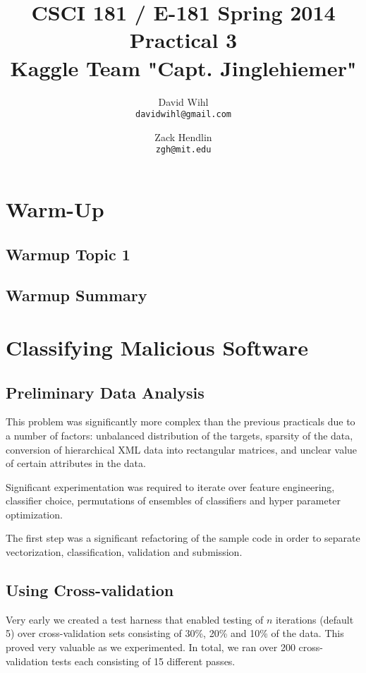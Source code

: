 \documentclass[11pt, oneside]{article}   	%
\title{CSCI 181 / E-181 Spring 2014 Practical 3 \\ 
{\large Kaggle Team "Capt. Jinglehiemer"}
}
\author{
  David Wihl\\
  \texttt{davidwihl@gmail.com}
  \and
  Zack Hendlin\\
  \texttt{zgh@mit.edu} 
}
\begin{document}
\maketitle
\section*{Warm-Up}

\subsection*{Warmup Topic 1}

\subsection*{Warmup Summary}

\section*{Classifying Malicious Software}

\subsection*{Preliminary Data Analysis}

This problem was significantly more complex than the previous practicals due to a number of factors: unbalanced distribution of the targets, sparsity of the data, conversion of hierarchical XML data into rectangular matrices, and unclear value of certain attributes in the data. 

Significant experimentation was required to iterate over feature engineering, classifier choice, permutations of ensembles of classifiers and hyper parameter optimization.

The first step was a significant refactoring of the sample code in order to separate vectorization, classification, validation and submission.

\subsection*{Using Cross-validation}

Very early we created a test harness that enabled testing of $n$ iterations (default 5) over cross-validation sets consisting of 30\%, 20\% and 10\% of the data. This proved very valuable as we experimented. In total, we ran over 200 cross-validation tests each consisting of 15 different passes.
\end{document}
